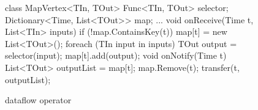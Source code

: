 \begin{figure}[t!]
\begin{numcodejava}
class MapVertex<TIn, TOut> {
  Func<TIn, TOut> selector;
  Dictionary<Time, List<TOut>> map;
  ...
  void onReceive(Time t, List<TIn> inputs) {
    if (!map.ContainsKey(t))
       map[t] = new List<TOut>();
    foreach (TIn input in inputs) {
      TOut output = selector(input);
      map[t].add(output);
    }
  }
  void onNotify(Time t) {
     List<TOut> outputList = map[t];
     map.Remove(t);
     transfer(t, outputList); 
  }
}
\end{numcodejava}
\caption{ dataflow operator}
\label{fig:motivating-eg}
\end{figure}